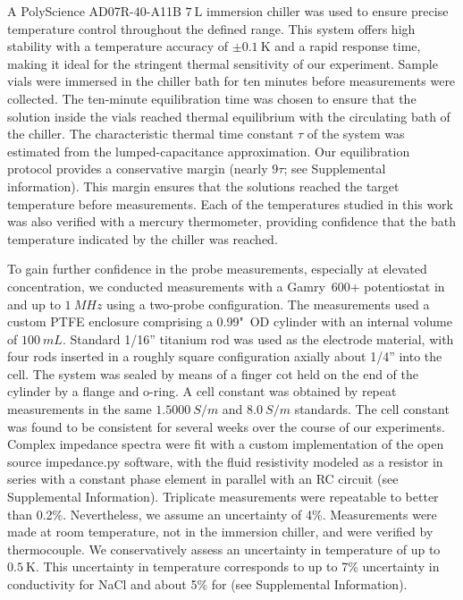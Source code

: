 \documentclass[journal=aesccq,manuscript=article]{achemso}
\begin{document}
A PolyScience AD07R-40-A11B $\SI{7}{\liter}$ immersion chiller was used to ensure precise temperature control throughout the defined range. 
This system offers high stability with a temperature accuracy of $\pm \SI{0.1}{\kelvin}$ and a rapid response time, making it ideal for the stringent thermal sensitivity of our experiment.
Sample vials were immersed in the chiller bath for ten minutes before measurements were collected. 
The ten-minute equilibration time was chosen to ensure that the solution inside the vials reached thermal equilibrium with the circulating bath of the chiller. 
The characteristic thermal time constant $\tau$ of the system was estimated from the lumped-capacitance approximation. 
Our equilibration protocol provides a conservative margin (nearly $9\tau$; see Supplemental information). 
This margin ensures that the solutions reached the target temperature before measurements. 
Each of the temperatures studied in this work was also verified with a mercury thermometer, providing confidence that the bath temperature indicated by the chiller was reached.

To gain further confidence in the probe measurements, especially at elevated concentration, we conducted measurements with a Gamry~600+ potentiostat in  and  up to $\SI{1}{MHz}$ using a two-probe configuration. 
The measurements used a custom PTFE enclosure comprising a 0.99"~OD cylinder with an internal volume of $\SI{100}{mL}$. 
Standard 1/16'' titanium rod was used as the electrode material, with four rods inserted in a roughly square configuration axially about 1/4'' into the cell. 
The system was sealed by means of a finger cot held on the end of the cylinder by a flange and o-ring. 
A cell constant was obtained by repeat measurements in the same 
$\SI{1.5000}{S \per m}$ and $\SI{8.0}{S \per m}$
standards. 
The cell constant was found to be consistent for several weeks over the course of our experiments. 
Complex impedance spectra were fit with a custom implementation of the open source impedance.py software\citep{murbach2020impedance}, with the fluid resistivity modeled as a resistor in series with a constant phase element in parallel with an RC circuit (see Supplemental Information). 
Triplicate measurements were repeatable to better than 0.2\%. 
Nevertheless, we assume an uncertainty of 4\%.
Measurements were made at room temperature, not in the immersion chiller, and were verified by thermocouple. 
We conservatively assess an uncertainty in temperature of up to $\SI{0.5}{\kelvin}$. 
This uncertainty in temperature corresponds to up to 7\% uncertainty in conductivity for NaCl and about 5\% for  (see Supplemental Information).
\end{document}
